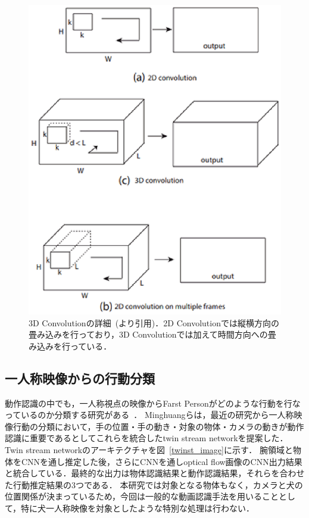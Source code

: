 \begin{figure}[htbp]
 \begin{center}
  \includegraphics[width=12cm]{./Figures/3dconv.eps}
  \caption{3D Convolutionの詳細~(\cite{tran14}より引用)．2D Convolutionでは縦横方向の畳み込みを行っており，3D Convolutionでは加えて時間方向への畳み込みを行っている．}
  \label{3dconv_image}
 \end{center}
\end{figure}


\subsection{一人称映像からの行動分類}
動作認識の中でも，一人称視点の映像からFarst Personがどのような行動を行なっているのか分類する研究がある~\cite{minghuang2016fpar}\cite{gedas2017dblp}．
Minghuangら\cite{minghuang2016fpar}は，最近の研究から一人称映像行動の分類において，手の位置・手の動き・対象の物体・カメラの動きが動作認識に重要であるとしてこれらを統合したtwin stream networkを提案した．
Twin stream networkのアーキテクチャを図~\ref{twinst_image}に示す．
腕領域と物体をCNNを通し推定した後，さらにCNNを通しoptical flow画像のCNN出力結果と統合している．最終的な出力は物体認識結果と動作認識結果，それらを合わせた行動推定結果の3つである．
本研究では対象となる物体もなく，カメラと犬の位置関係が決まっているため，今回は一般的な動画認識手法を用いることとして，特に犬一人称映像を対象としたような特別な処理は行わない．

